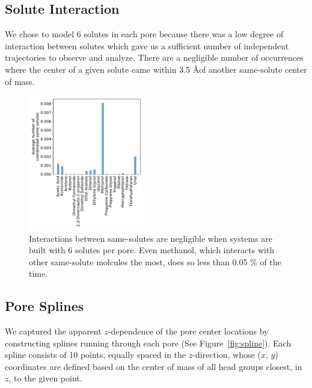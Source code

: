 \documentclass{article}
\begin{document}
  \subsection{Solute Interaction}\label{section:solute_interaction}
  
  We chose to model 6 solutes in each pore because there was a low degree of 
  interaction between solutes which gave us a sufficient number of independent 
  trajectories to observe and analyze. There are a negligible number of occurrences
  where the center of a given solute came within 3.5 \AA of another same-solute
  center of mass.
  
  \begin{figure}[!htb]
  \centering
  \includegraphics[width=0.45\textwidth]{solute_interaction.pdf}
  \caption{Interactions between same-solutes are negligible when systems are 
  built with 6 solutes per pore. Even methanol, which interacts with other same-solute
  molcules the most, does so less than 0.05 \% of the time.}\label{fig:solute_interation}
  \end{figure}
  
  \subsection{Pore Splines}\label{section:splines}
  
  We captured the apparent $z$-dependence of the pore center locations by
  constructing splines running through each pore (See Figure~\ref{fig:spline}).
  Each spline consists of 10 points, equally spaced in the $z$-direction, whose
  ($x$, $y$) coordinates are defined based on the center of mass of all head
  groups closest, in $z$, to the given point.
  
\end{document}
